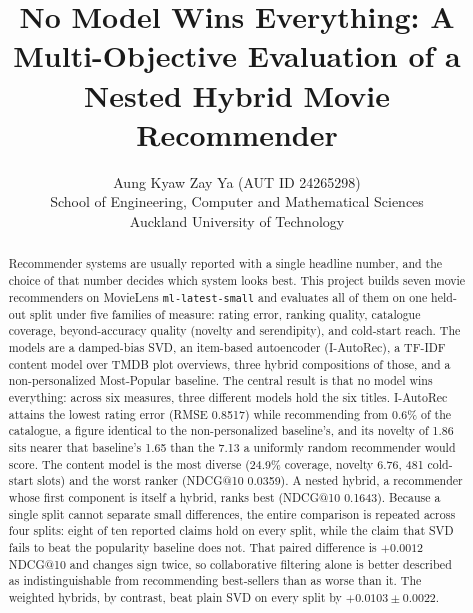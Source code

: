 \documentclass[10pt,twocolumn,letterpaper]{article}
\newif\ifdraftnotes
\newcommand{\TODO}[1]{\ifdraftnotes
  \par\noindent\fcolorbox{orange!60}{yellow!12}{%
    \parbox{0.95\linewidth}{\footnotesize\textbf{TODO}\ \textit{#1}}}\par\medskip
\fi}
\begin{document}
\title{No Model Wins Everything: A Multi-Objective Evaluation of a\\
       Nested Hybrid Movie Recommender}

\author{Aung Kyaw Zay Ya \quad (AUT ID 24265298)\\
School of Engineering, Computer and Mathematical Sciences\\
Auckland University of Technology\\
{\tt{}}}

\maketitle

\TODO{Replace the email placeholder in the author block with your AUT student address, and confirm the title.}

\begin{abstract}
Recommender systems are usually reported with a single headline number, and
the choice of that number decides which system looks best. This project builds
seven movie recommenders on MovieLens \texttt{ml-latest-small} and evaluates
all of them on one held-out split under five families of measure: rating
error, ranking quality, catalogue coverage, beyond-accuracy quality (novelty
and serendipity), and cold-start reach. The models are a damped-bias SVD, an
item-based autoencoder (I-AutoRec), a TF-IDF content model over TMDB plot
overviews, three hybrid compositions of those, and a non-personalized
Most-Popular baseline. The central result is that no model wins everything:
across six measures, three different models hold the six titles. I-AutoRec
attains the lowest rating error (RMSE 0.8517) while recommending from 0.6\% of
the catalogue, a figure identical to the non-personalized baseline's, and its
novelty of 1.86 sits nearer that baseline's 1.65 than the 7.13 a uniformly
random recommender would score. The content model is the most diverse (24.9\%
coverage, novelty 6.76, 481 cold-start slots) and the worst ranker (NDCG@10
0.0359). A nested hybrid, a recommender whose first component is itself a
hybrid, ranks best (NDCG@10 0.1643). Because a single split cannot separate
small differences, the entire comparison is repeated across four splits: eight
of ten reported claims hold on every split, while the claim that SVD fails to
beat the popularity baseline does not. That paired difference is $+0.0012$
NDCG@10 and changes sign twice, so collaborative filtering alone is better
described as indistinguishable from recommending best-sellers than as worse
than it. The weighted hybrids, by contrast, beat plain SVD on every split by
$+0.0103 \pm 0.0022$.
\end{abstract}
\end{document}
